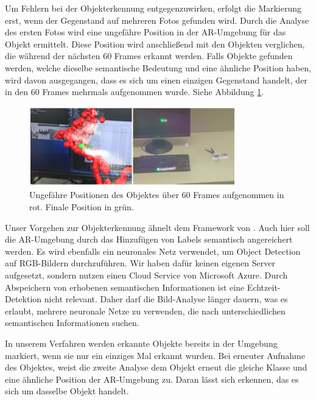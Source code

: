 Um Fehlern bei der Objekterkennung entgegenzuwirken, erfolgt die Markierung erst, wenn der Gegenstand auf mehreren Fotos gefunden wird. Durch die Analyse des ersten Fotos wird eine ungefähre Position in der AR-Umgebung für das Objekt ermittelt. Diese Position wird anschließend mit den Objekten verglichen, die während der nächsten 60 Frames erkannt werden. Falls Objekte gefunden werden, welche dieselbe semantische Bedeutung und eine ähnliche Position haben, wird davon ausgegangen, dass es sich um einen einzigen Gegenstand handelt, der in den 60 Frames mehrmals aufgenommen wurde. Siehe Abbildung \ref{img:60frames}.

\begin{figure}[H]
	\centering
	\includegraphics[width=0.8\textwidth]{images/img_huynh.PNG}
	\caption[Objekterkennung von \cite{LabelingLanguageLearning}]{Ungefähre Positionen des Objektes über 60 Frames aufgenommen in rot. Finale Position in grün.\citep{LabelingLanguageLearning}}
	\label{img:60frames}
\end{figure}

Unser Vorgehen zur Objekterkennung ähnelt dem Framework von \cite{LabelingLanguageLearning}. Auch hier soll die AR-Umgebung durch das Hinzufügen von Labels semantisch angereichert werden. Es wird ebenfalls ein neuronales Netz verwendet, um Object Detection auf RGB-Bildern durchzuführen. Wir haben dafür keinen eigenen Server aufgesetzt, sondern nutzen einen Cloud Service von Microsoft Azure. Durch Abspeichern von erhobenen semantischen Informationen ist eine Echtzeit-Detektion nicht relevant. Daher darf die Bild-Analyse länger dauern, was es erlaubt, mehrere neuronale Netze zu verwenden, die nach unterschiedlichen semantischen Informationen suchen.

In unserem Verfahren werden erkannte Objekte bereits in der Umgebung markiert, wenn sie nur ein einziges Mal erkannt wurden. Bei erneuter Aufnahme des Objektes, weist die zweite Analyse dem Objekt erneut die gleiche Klasse und eine ähnliche Position der AR-Umgebung zu. Daran lässt sich erkennen, das es sich um dasselbe Objekt handelt.

